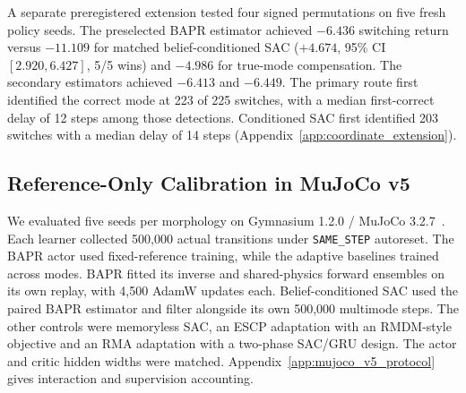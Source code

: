 \documentclass[twoside,11pt]{article}
\begin{document}
A separate preregistered extension tested four signed permutations on five fresh policy seeds. The preselected BAPR estimator achieved $-6.436$ switching return versus $-11.109$ for matched belief-conditioned SAC ($+4.674$, 95\% CI $[2.920,6.427]$, 5/5 wins) and $-4.986$ for true-mode compensation. The secondary estimators achieved $-6.413$ and $-6.449$. The primary route first identified the correct mode at 223 of 225 switches, with a median first-correct delay of 12 steps among those detections. Conditioned SAC first identified 203 switches with a median delay of 14 steps (Appendix~\ref{app:coordinate_extension}).

\FloatBarrier
\subsection{Reference-Only Calibration in MuJoCo v5}
\label{sec:mujoco_v5}

We evaluated five seeds per morphology on Gymnasium 1.2.0 / MuJoCo 3.2.7~\citep{Todorov2012MuJoCo,Towers2024Gymnasium}. Each learner collected 500,000 actual transitions under \texttt{SAME\_STEP} autoreset. The BAPR actor used fixed-reference training, while the adaptive baselines trained across modes. BAPR fitted its inverse and shared-physics forward ensembles on its own replay, with 4,500 AdamW updates each. Belief-conditioned SAC used the paired BAPR estimator and filter alongside its own 500,000 multimode steps. The other controls were memoryless SAC, an ESCP adaptation with an RMDM-style objective and an RMA adaptation with a two-phase SAC/GRU design. The actor and critic hidden widths were matched. Appendix~\ref{app:mujoco_v5_protocol} gives interaction and supervision accounting.
\end{document}
